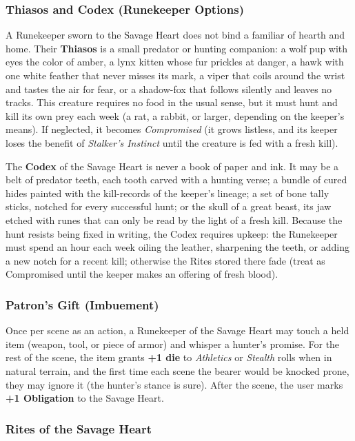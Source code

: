 \subsubsection*{Thiasos and Codex (Runekeeper Options)}

A Runekeeper sworn to the Savage Heart does not bind a familiar of hearth and home. Their \textbf{Thiasos} is a small predator or hunting companion: a wolf pup with eyes the color of amber, a lynx kitten whose fur prickles at danger, a hawk with one white feather that never misses its mark, a viper that coils around the wrist and tastes the air for fear, or a shadow-fox that follows silently and leaves no tracks. This creature requires no food in the usual sense, but it must hunt and kill its own prey each week (a rat, a rabbit, or larger, depending on the keeper's means). If neglected, it becomes \textit{Compromised} (it grows listless, and its keeper loses the benefit of \textit{Stalker's Instinct} until the creature is fed with a fresh kill).

The \textbf{Codex} of the Savage Heart is never a book of paper and ink. It may be a belt of predator teeth, each tooth carved with a hunting verse; a bundle of cured hides painted with the kill-records of the keeper's lineage; a set of bone tally sticks, notched for every successful hunt; or the skull of a great beast, its jaw etched with runes that can only be read by the light of a fresh kill. Because the hunt resists being fixed in writing, the Codex requires upkeep: the Runekeeper must spend an hour each week oiling the leather, sharpening the teeth, or adding a new notch for a recent kill; otherwise the Rites stored there fade (treat as Compromised until the keeper makes an offering of fresh blood).

\subsubsection*{Patron's Gift (Imbuement)}

Once per scene as an action, a Runekeeper of the Savage Heart may touch a held item (weapon, tool, or piece of armor) and whisper a hunter's promise. For the rest of the scene, the item grants \textbf{+1 die} to \textit{Athletics} or \textit{Stealth} rolls when in natural terrain, and the first time each scene the bearer would be knocked prone, they may ignore it (the hunter's stance is sure). After the scene, the user marks \textbf{+1 Obligation} to the Savage Heart.

\subsubsection*{Rites of the Savage Heart}

